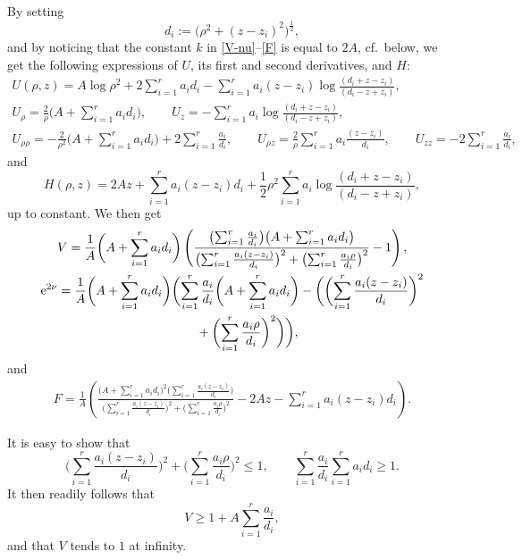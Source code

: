 \documentclass[10pt,a4paper]{amsart}
\numberwithin{equation}{section}
\begin{document}
By setting
\[ d_i := \big(\rho ^2 + (z - z_i)^2\big)^{\frac{1}{2}}, \]
and by noticing that the constant $k$ in \eqref{V-nu}--\eqref{F} is equal to $2 A$, cf.\ below, we get the following expressions of $U$, its first and second derivatives, and $H$:
\begin{gather} U (\rho, z) = A \log{\rho ^2} + 2 \sum _{i = 1}^r a_i d_i - \sum _{i = 1}^r a _i (z - z_i) \log{\frac{(d_i + z - z_i)}{(d_i - z + z_i)}},\label{U-def} \\
U_{\rho} = \frac{2}{\rho} \bigg(A + \sum _{i = 1}^r a_i d_i\bigg), \qquad U_z = - \sum _{i = 1}^r a_i \log{\frac{(d_i + z - z_i)}{(d_i - z + z_i)}}, \label{U-rho-z} \\
 U_{\rho \rho} = - \frac{2}{\rho ^2} \bigg(A + \sum _{i = 1} ^r a _i d _i\bigg) + 2 \sum _{i = 1} ^r \frac{a_i}{d_i}, \qquad U_{\rho z} = \frac{2}{\rho} \sum _{i = 1} ^r a_i \frac{(z - z_i)}{d_i}, \qquad
U _{z z} = - 2 \sum _{i = 1} ^r \frac{a _i}{d_i},\nonumber%
 \end{gather}
and
\[%
H (\rho, z) = 2 A z + \sum _{i = 1}^r a _i (z - z_i) d _i + \frac{1}{2} \rho ^2 \sum_{i = 1}^r a _i \log{\frac{(d_i + z - z_i)}{(d_i - z + z_i)}}, \]
up to constant.
We then get
\begin{gather}
 V = \frac{1}{A} \biggl(A + \sum _{i = 1} ^r a_i d_i\biggr) \left(\frac{\bigl(\sum _{i = 1}^r \frac{a_i}{d_i}\bigr) \bigl(A + \sum _{i = 1} ^r a_i d_i\bigr)}{\bigl(\sum _{i = 1}^r \frac{a _i (z - z_i)}{d_i}\bigr) ^2 + \bigl(\sum _{i = 1}^r \frac{a _i \rho}{d_i}\bigr)^2} - 1\right), \label{V-def} \\
 {\rm e}^{2 \nu} = \frac{1}{A} \biggl(A + \sum _{i = 1} ^r a_i d_i\biggr) \biggl(\sum _{i = 1}^r \frac{a_i}{d_i} \biggl(A + \sum _{i = 1} ^r a_i d_i\biggr) - \biggl(\biggl(\sum _{i = 1}^r \frac{a _i (z - z_i)}{d_i}\biggr) ^2 \nonumber\\
 \hphantom{{\rm e}^{2 \nu} =}{}+ \biggl(\sum _{i = 1}^r \frac{a _i \rho}{d_i}\biggr)^2\biggr)\biggr), \label{nu-def}
 \end{gather}
and
\begin{gather} \label{F-def} F = \frac{1}{A} \left(\frac{\bigl(A + \sum _{i = 1} ^r a_i d_i\bigr)^2 \bigl(\sum _{i = 1}^r \frac{a _i (z - z_i)}{d_i}\bigr)}{\bigl(\sum _{i = 1}^r \frac{a _i (z - z_i)}{d_i}\bigr) ^2 + \bigl(\sum _{i = 1}^r \frac{a _i \rho}{d_i}\bigr)^2} - 2 A z - \sum _{i = 1}^r a_i (z - z_i) d_i\right). \end{gather}

It is easy to show that
\[\bigg(\sum _{i = 1} ^r \frac{a _i (z - z_i)}{d_i}\bigg)^2 + \bigg(\sum _{i = 1} ^r \frac{a _i \rho}{d_i}\bigg)^2 \leq 1,
\qquad \sum _{i = 1} ^r \frac{a_i}{d_i} \sum _{i = 1} ^r a _i d _i \geq 1.
\]
It then readily follows that
\[ V \geq 1 + A \sum _{i = 1} ^r \frac{a_i}{d_i}, \]
and that $V$ tends to $1$ at infinity.
\end{document}
